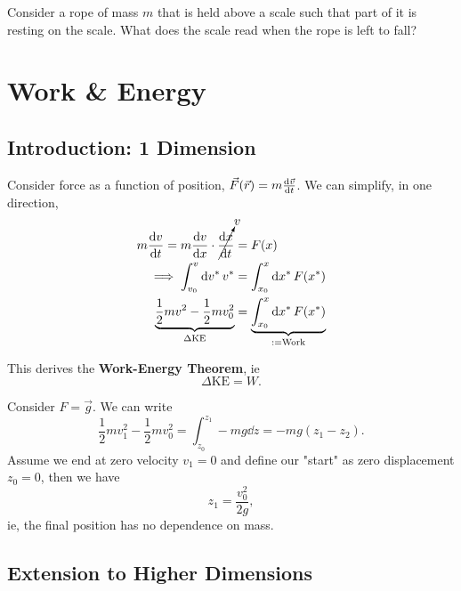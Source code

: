 \documentclass[12pt]{article}
\begin{document}
\begin{example}
  Consider a rope of mass $m$ that is held above a scale such that part of it is resting on the scale. What does the scale read when the rope is left to fall?\\
\end{example}

\section{Work \& Energy}

\subsection{Introduction: 1 Dimension}

Consider force as a function of position, $\vec{F}(\vec{r}) = m \dv{\vec{v}}{t}$. We can simplify, in one direction, \begin{align*}
  m \dv{v}{t} = m \dv{v}{x}\cdot\cancelto{v}{\dv{x}{t}} &= F(x)\\
  \implies \int_{v_0}^v \dd{v^*} v^* &= \int_{x_0}^x \dd{x^*} F(x^*)\\
  \underbrace{\frac{1}{2}mv^2 - \frac{1}{2}mv_0^2}_{\Delta \text{KE}} &= \underbrace{\int_{x_0}^x \dd{x^*} F(x^*)}_{:=\text{Work}}
\end{align*}

This derives the \textbf{Work-Energy Theorem}, ie \[\Delta \text{KE} = W.\]

\begin{example}
  Consider $F = \vec{g}$. We can write \[\frac{1}{2}m v_1^2 - \frac{1}{2}m v_0^2 = \int_{z_0}^{z_1} - mg \dd{z} = -mg(z_1- z_2).\] Assume we end at zero velocity $v_1 = 0$ and define our "start" as zero displacement $z_0 = 0$, then we have \[z_1 = \frac{v_0^2}{2g},\] ie, the final position has no dependence on mass.
\end{example}

\subsection{Extension to Higher Dimensions}
\end{document}
